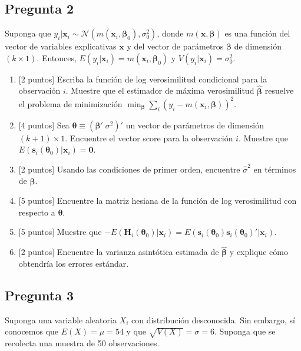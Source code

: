 \documentclass[
  letterpaper,
  DIV=11,
  numbers=noendperiod]{scrartcl}
\begin{document}
\hypertarget{pregunta-2}{%
\subsection{Pregunta 2}\label{pregunta-2}}

Suponga que
\(y_i|\mathbf{x}_i\sim\mathcal{N}(m(\mathbf{x}_i,\mathbf{\beta}_0),\sigma_0^2)\),
donde \(m(\mathbf{x},\mathbf{\beta})\) es una función del vector de
variables explicativas \(\mathbf{x}\) y del vector de parámetros
\(\mathbf{\beta}\) de dimensión \((k\times 1)\). Entonces,
\(E(y_i|\mathbf{x}_i)=m(\mathbf{x}_i,\mathbf{\beta}_0)\) y
\(V(y_i|\mathbf{x}_i)=\sigma^2_0\).

\begin{enumerate}
\def\labelenumi{\alph{enumi}.}
\item
  {[}2 puntos{]} Escriba la función de log verosimilitud condicional
  para la observación \(i\). Muestre que el estimador de máxima
  verosimilitud \(\hat{\mathbf{\beta}}\) resuelve el problema de
  minimización
  \(\min_\mathbf{\beta}\sum_i(y_i-m(\mathbf{x}_i,\mathbf{\beta}))^2\).
\item
  {[}4 puntos{]} Sea
  \(\mathbf{\theta}\equiv(\mathbf{\beta}'\;\sigma^2)'\) un vector de
  parámetros de dimensión \((k+1)\times 1\). Encuentre el vector score
  para la observación \(i\). Muestre que
  \(E(\mathbf{s}_i(\mathbf{\theta}_0)|\mathbf{x}_i)=\mathbf{0}\).
\item
  {[}2 puntos{]} Usando las condiciones de primer orden, encuentre
  \(\hat{\sigma}^2\) en términos de \(\hat{\mathbf{\beta}}\).
\item
  {[}5 puntos{]} Encuentre la matriz hesiana de la función de log
  verosimilitud con respecto a \(\mathbf{\theta}\).
\item
  {[}5 puntos{]} Muestre que
  \(-E(\mathbf{H}_i(\mathbf{\theta}_0)|\mathbf{x}_i)=E(\mathbf{s}_i(\mathbf{\theta}_0)\mathbf{s}_i(\mathbf{\theta}_0)'|\mathbf{x}_i)\).
\item
  {[}2 puntos{]} Encuentre la varianza asintótica estimada de
  \(\hat{\mathbf{\beta}}\) y explique cómo obtendría los errores
  estándar.
\end{enumerate}

\hypertarget{pregunta-3}{%
\subsection{Pregunta 3}\label{pregunta-3}}

Suponga una variable aleatoria \(X_i\) con distribución desconocida. Sin
embargo, sí conocemos que \(E(X)=\mu=54\) y que
\(\sqrt{V(X)}=\sigma=6\). Suponga que se recolecta una muestra de 50
observaciones.
\end{document}
